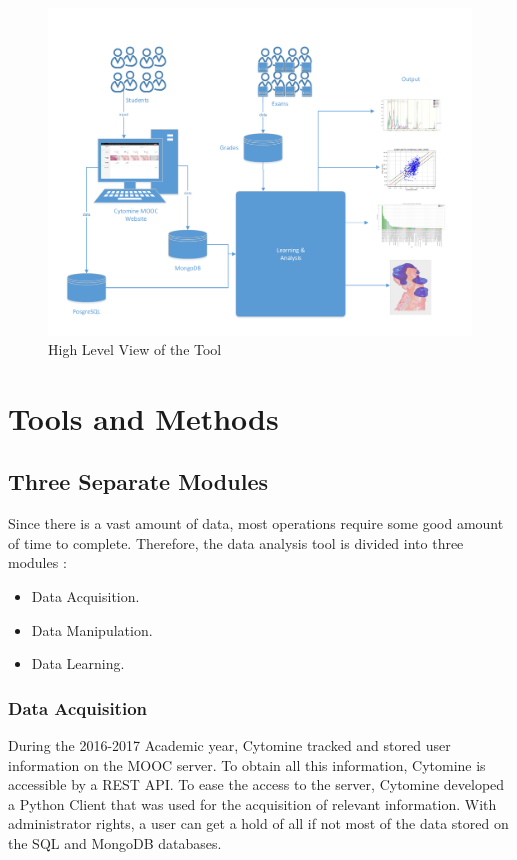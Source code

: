 \documentclass[a4paper,11pt]{report}
\numberwithin{figure}{section} %
\begin{document}
      \begin{figure}[H]
      \centering
      \includegraphics[width=.95\linewidth]{highlevel.pdf}
      \caption{High Level View of the Tool}
      \label{fig:highlevel}
      \end{figure}

\section{Tools and Methods}
	
    \subsection{Three Separate Modules}
    	Since there is a vast amount of data, most operations require some good amount of time to complete.
    	Therefore, the data analysis tool is divided into three modules :
        \begin{itemize}
        \item[\textbullet] Data Acquisition.
        \item[\textbullet] Data Manipulation.
        \item[\textbullet] Data Learning.
        \end{itemize}

		\subsubsection{Data Acquisition}
        
			During the 2016-2017 Academic year, Cytomine tracked and stored user information on the MOOC server. To obtain all this information, Cytomine is accessible by a REST API. To ease the access to the server, Cytomine developed a Python Client that was used for the acquisition of relevant information. With administrator rights, a user can get a hold of all if not most of the data stored on the SQL and MongoDB databases.
            
\end{document}
